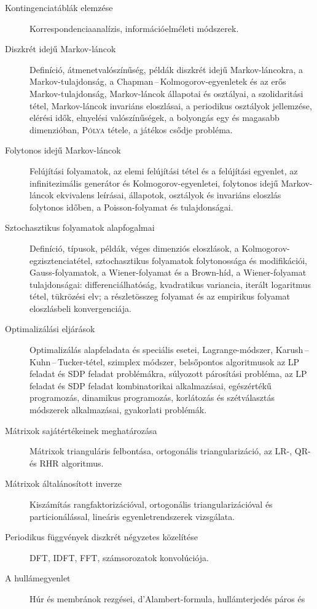 \documentclass[DIV=15,appendixprefix]{scrreprt}
\theoremstyle{definition}
\theoremstyle{remark}
\begin{document}
\begin{description}
%
	\item[Kontingenciatáblák elemzése] Korrespondenciaanalízis, információelméleti módszerek.
%
	\item[Diszkrét idejű Markov-láncok] Definíció, átmenetvalószínűség, példák diszkrét idejű
	Markov-lán\-cok\-ra, a Markov-tulajdonság, a Chapman\,--\,Kolmogorov-egyenletek és az erős
	Markov-tu\-laj\-don\-ság, Markov-láncok állapotai és osztályai, a szolidaritási tétel, Markov-láncok
	invariáns eloszlásai, a periodikus osztályok jellemzése, elérési idők, elnyelési valószínűségek,
	a bolyongás egy és magasabb dimenzióban, \textsc{Pólya} tétele, a játékos csődje probléma.
%
	\item[Folytonos idejű Markov-láncok] Felújítási folyamatok, az elemi felújítási tétel és a
	felújítási egyenlet, az infinitezimális generátor és Kolmogorov-egyenletei, folytonos idejű
	Markov-láncok ekvivalens leírásai, állapotok, osztályok és invariáns eloszlás folytonos időben,
	a Poisson-folyamat és tulajdonságai.
%
	\item[Sztochasztikus folyamatok alapfogalmai] Definíció, típusok, példák, véges dimenziós
	eloszlások, a Kolmogorov-egzisztenciatétel, sztochasztikus folyamatok folytonossága és
	modifikációi, Gauss-folyamatok, a Wiener-folyamat és a Brown-híd, a Wiener-folyamat
	tulajdonságai: differenciálhatóság, kvadratikus variancia, iterált logaritmus tétel, tükrözési
	elv; a részletösszeg folyamat és az empirikus folyamat eloszlásbeli konvergenciája.
%
	\item[Optimalizálási eljárások] Optimalizálás alapfeladata és speciális esetei,
	Lagrange-módszer, Karush\,--\,Kuhn\,--\,Tucker-tétel, szimplex módszer, belsőpontos algoritmusok
	az LP feladat és SDP feladat problémákra, súlyozott párosítási probléma, az LP feladat és SDP
	feladat kombinatorikai alkalmazásai, egészértékű programozás, dinamikus programozás, korlátozás
	és szétválasztás módszerek alkalmazásai, gyakorlati problémák.
%
	\item[Mátrixok sajátértékeinek meghatározása] Mátrixok trianguláris felbontása, ortogonális
	triangularizáció, az LR-, QR- és RHR algoritmus.
%
	\item[Mátrixok általánosított inverze] Kiszámítás rangfaktorizációval, ortogonális
	triangularizációval és particionálással, lineáris egyenletrendszerek vizsgálata.
%
	\item[Periodikus függvények diszkrét négyzetes közelítése] DFT, IDFT, FFT, számsorozatok
	konvolúciója.
%
	\item[A hullámegyenlet] Húr és membránok rezgései, d'Alambert-formula, hullámterjedés páros és

\end{description}
\end{document}
